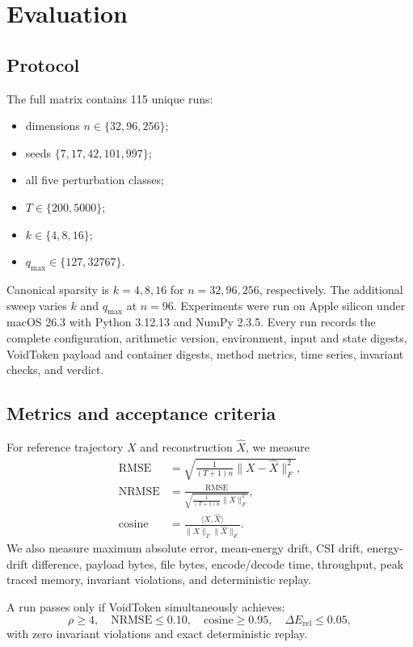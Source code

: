 \documentclass[10pt]{article}
\begin{document}
\section{Evaluation}

\subsection{Protocol}

The full matrix contains 115 unique runs:
\begin{itemize}[leftmargin=1.4em,itemsep=1pt]
  \item dimensions $n\in\{32,96,256\}$;
  \item seeds $\{7,17,42,101,997\}$;
  \item all five perturbation classes;
  \item $T\in\{200,5000\}$;
  \item $k\in\{4,8,16\}$;
  \item $q_{\max}\in\{127,32767\}$.
\end{itemize}
Canonical sparsity is $k=4,8,16$ for $n=32,96,256$, respectively. The
additional sweep varies $k$ and $q_{\max}$ at $n=96$. Experiments were run on
Apple silicon under macOS 26.3 with Python 3.12.13 and NumPy 2.3.5. Every run
records the complete configuration, arithmetic version, environment, input and
state digests, VoidToken payload and container digests, method metrics, time
series, invariant checks, and verdict.

\subsection{Metrics and acceptance criteria}

For reference trajectory $X$ and reconstruction $\widehat{X}$, we measure
\begin{align}
  \mathrm{RMSE} &=
    \sqrt{\frac{1}{(T+1)n}\lVert X-\widehat{X}\rVert_F^2},\\
  \mathrm{NRMSE} &= \frac{\mathrm{RMSE}}
    {\sqrt{\frac{1}{(T+1)n}\lVert X\rVert_F^2}},\\
  \mathrm{cosine} &= \frac{\langle X,\widehat{X}\rangle}
    {\lVert X\rVert_F\lVert\widehat{X}\rVert_F}.
\end{align}
We also measure maximum absolute error, mean-energy drift, CSI drift,
energy-drift difference, payload bytes, file bytes, encode/decode time,
throughput, peak traced memory, invariant violations, and deterministic replay.

A run passes only if VoidToken simultaneously achieves:
\begin{equation}
  \rho\geq4,\quad
  \mathrm{NRMSE}\leq0.10,\quad
  \mathrm{cosine}\geq0.95,\quad
  \Delta E_{\mathrm{rel}}\leq0.05,
\end{equation}
with zero invariant violations and exact deterministic replay.
\end{document}
